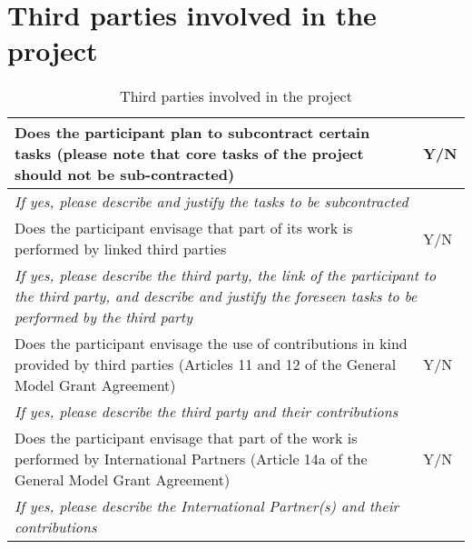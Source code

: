 \section{Third parties involved in the project}

\begin{table}[]
	\centering
	\begin{tabular}{|p{10cm}|p{4cm}|}
		\hline
		Does the participant plan to subcontract certain tasks (please note that core tasks of the project should not be sub-contracted)                                          & Y/N                        \\ \hline
		\multicolumn{2}{|p{14cm}|}{\textit{If yes, please describe and justify the tasks to be subcontracted}}                                                                                                       \\ \hline
		Does the participant envisage that part of its work is performed by linked third parties                                                                                  & Y/N                        \\ \hline
		\multicolumn{2}{|p{14cm}|}{\textit{If yes, please describe the third party, the link of the participant to the third party, and describe and justify the foreseen tasks to be performed by the third party}} \\ \hline
		Does the participant envisage the use of contributions in kind provided by third parties (Articles 11 and 12 of the General Model Grant Agreement)                        & Y/N                        \\ \hline
		\multicolumn{2}{|p{14cm}|}{\textit{If yes, please describe the third party and their contributions}}                                                                                                         \\ \hline
		Does the participant envisage that part of the work is performed by International Partners (Article 14a of the General Model Grant Agreement)                             & Y/N                        \\ \hline
		\multicolumn{2}{|p{14cm}|}{\textit{If yes, please describe the International Partner(s) and their contributions}}                                                                                            \\ \hline
	\end{tabular}
	\caption{Third parties involved in the project}
\end{table}
